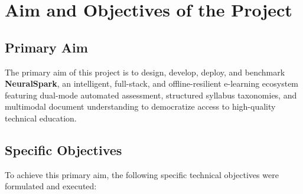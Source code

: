 \section{Aim and Objectives of the Project}

\subsection{Primary Aim}
The primary aim of this project is to design, develop, deploy, and benchmark \textbf{NeuralSpark}, an intelligent, full-stack, and offline-resilient e-learning ecosystem featuring dual-mode automated assessment, structured syllabus taxonomies, and multimodal document understanding to democratize access to high-quality technical education.

\subsection{Specific Objectives}
To achieve this primary aim, the following specific technical objectives were formulated and executed:
